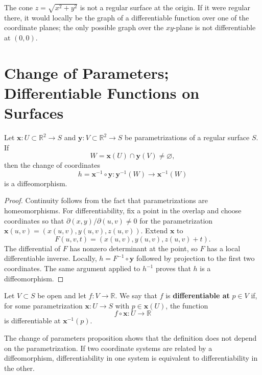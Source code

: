 \documentclass[12pt, oneside]{book}
\begin{document}
\begin{remark}
    The cone $z=\sqrt{x^2+y^2}$ is not a regular surface at the origin.  If it
    were regular there, it would locally be the graph of a differentiable
    function over one of the coordinate planes; the only possible graph over the
    $xy$-plane is not differentiable at $(0,0)$.
\end{remark}

\section{Change of Parameters; Differentiable Functions on Surfaces}

\begin{proposition}
    Let $\mathbf{x}:U\subset \mathbb{R}^2\rightarrow S$ and
    $\mathbf{y}:V\subset \mathbb{R}^2\rightarrow S$ be parametrizations of a
    regular surface $S$.  If
    \[
        W=\mathbf{x}(U)\cap \mathbf{y}(V)\neq \varnothing,
    \]
    then the change of coordinates
    \[
        h=\mathbf{x}^{-1}\circ \mathbf{y}:
        \mathbf{y}^{-1}(W)\rightarrow \mathbf{x}^{-1}(W)
    \]
    is a diffeomorphism.
\end{proposition}

\begin{proof}
    Continuity follows from the fact that parametrizations are
    homeomorphisms.  For differentiability, fix a point in the overlap and
    choose coordinates so that
    $\partial(x,y)/\partial(u,v)\neq 0$ for the parametrization
    $\mathbf{x}(u,v)=(x(u,v),y(u,v),z(u,v))$.  Extend $\mathbf{x}$ to
    \[
        F(u,v,t)=(x(u,v),y(u,v),z(u,v)+t).
    \]
    The differential of $F$ has nonzero determinant at the point, so $F$ has a
    local differentiable inverse.  Locally, $h=F^{-1}\circ \mathbf{y}$ followed
    by projection to the first two coordinates.  The same argument applied to
    $h^{-1}$ proves that $h$ is a diffeomorphism.
\end{proof}

\begin{definition}
    Let $V\subset S$ be open and let $f:V\rightarrow \mathbb{R}$.  We say
    that $f$ is \textbf{differentiable at} $p\in V$ if, for some
    parametrization $\mathbf{x}:U\rightarrow S$ with $p\in \mathbf{x}(U)$,
    the function
    \[
        f\circ \mathbf{x}:U\rightarrow \mathbb{R}
    \]
    is differentiable at $\mathbf{x}^{-1}(p)$.
\end{definition}

\begin{remark}
    The change of parameters proposition shows that the definition does not
    depend on the parametrization.  If two coordinate systems are related by a
    diffeomorphism, differentiability in one system is equivalent to
    differentiability in the other.
\end{remark}
\end{document}
